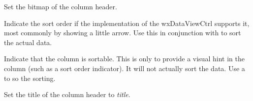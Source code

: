 
Set the bitmap of the column header.

\label{wxdataviewcolumnsetsortorder}


Indicate the sort order if the implementation of the
wxDataViewCtrl supports it, most commonly by showing
a little arrow. Use this in conjunction with 
to sort the actual data.

\label{wxdataviewcolumnsetsortable}


Indicate that the column is sortable. This is only to provide a
visual hint in the column (such as a sort order indicator). It
will not actually sort the data. Use a 
to so the sorting.

\label{wxdataviewcolumnsettitle}


Set the title of the column header to {\it title}.


